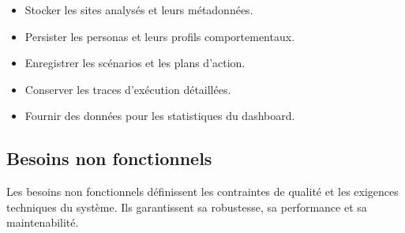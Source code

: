 \begin{itemize}
\item Stocker les sites analysés et leurs métadonnées.\\
\item Persister les personas et leurs profils comportementaux.\\
\item Enregistrer les scénarios et les plans d’action.\\
\item Conserver les traces d’exécution détaillées.\\
\item Fournir des données pour les statistiques du dashboard.\\
\end{itemize}


\subsection{Besoins non fonctionnels}

Les besoins non fonctionnels définissent les contraintes de qualité et les exigences techniques du système. Ils garantissent sa robustesse, sa performance et sa maintenabilité.\\

